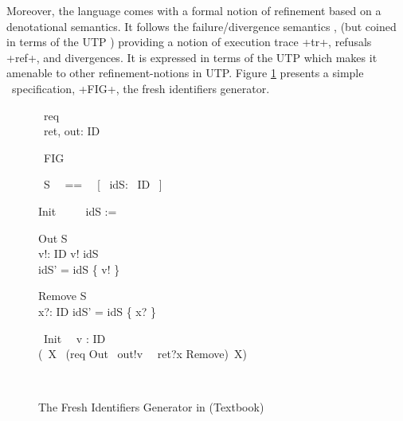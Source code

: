 \documentclass[11pt,a4paper]{article}
\begin{document}
Moreover, the language comes with a formal notion of refinement based on a 
denotational semantics. It follows the failure/divergence semantics \cite{Roscoe:1997:TPC:550448}, 
(but coined in terms of the UTP \cite{CircusDS}) providing a notion of execution trace \inlineisar+tr+, 
refusals \inlineisar+ref+, and divergences. %
It is expressed in terms of the UTP \cite{HJ98} 
which makes it amenable to other refinement-notions in UTP. %
Figure \ref{figure:Fig} presents a simple \Circus\ specification,  \inlineisar+FIG+, the fresh identifiers generator.\\

\vspace{-.8cm}
\begin{figure}[h]
\begin{zed}
    [ID]
\end{zed}
\vspace{-.8cm}
\begin{circus}
    \circchannel\ req\\
    \circchannel\ ret, out: ID
\end{circus}
\vspace{-.9cm}
\begin{circus}
    \circprocess\ FIG ~~\circdef~~ \circbegin\
\end{circus}
\vspace{-1.0cm}
\begin{circusaction}
     \circstate\ S ~~==~~ [~ idS: \power~ID  ~]   
 \end{circusaction}
\vspace{-1.0cm}
 \begin{circusaction}
     Init ~~\circdef~~ idS := \emptyset
 \end{circusaction}%
\vspace{-1.2cm}
\begin{multicols}{2}
\begin{schema}{Out}
     \Delta S \\
      v!: ID
 \where
    v! \notin idS \\ 
    idS' = idS \cup \{ v! \}
 \end{schema}%
\begin{schema}{Remove}
     \Delta S \\
      x?: ID
 \where
     idS' = idS \setminus \{ x? \}
 \end{schema}%
\end{multicols}
\vspace{-.5cm}
 \begin{circusaction}
     \circspot\ Init \circseq\ \circvar\ v : ID \circspot\ \\
  (\circmu\ X \circspot\ (req \then Out \circseq\ out!v \then \Skip\ \extchoice\ ret?x \then Remove)\circseq\ X)
 \end{circusaction}
\vspace{-.9cm}
 \begin{circus}
     \circend\
 \end{circus}
\vspace{-1cm}
\caption{\label{figure:Fig} The Fresh Identifiers Generator in (Textbook) \Circus\ }
\vspace{-.55cm}
\end{figure}
\end{document}
